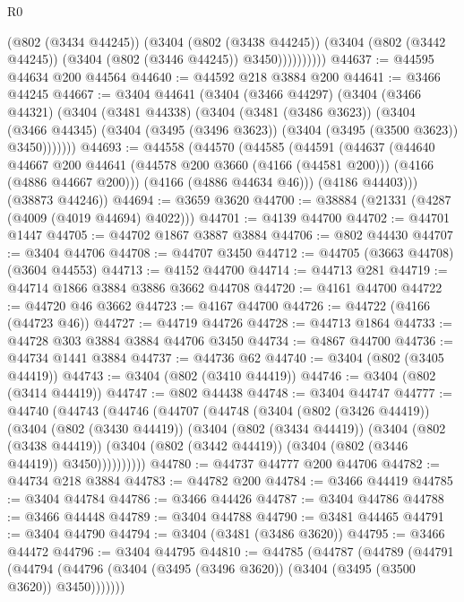 \begin{lexlean}{R0}
\begin{coremodule}
                  (@802 (@3434 @44245))
                  (@3404
                    (@802 (@3438 @44245))
                    (@3404 (@802 (@3442 @44245)) (@3404 (@802 (@3446 @44245)) @3450))))))))))
@44637 := @44595 @44634 @200 @44564
@44640 := @44592 @218 @3884 @200
@44641 := @3466 @44245
@44667 := @3404
    @44641
    (@3404
      (@3466 @44297)
      (@3404
        (@3466 @44321)
        (@3404
          (@3481 @44338)
          (@3404
            (@3481 (@3486 @3623))
            (@3404
              (@3466 @44345)
              (@3404 (@3495 (@3496 @3623)) (@3404 (@3495 (@3500 @3623)) @3450)))))))
@44693 := @44558
    (@44570
      (@44585
        (@44591
          (@44637
            (@44640
              @44667
              @200
              @44641
              (@44578 @200 @3660 (@4166 (@44581 @200)))
              (@4166 (@4886 @44667 @200)))
            (@4166 (@4886 @44634 @46)))
          (@4186 @44403)))
      (@38873 @44246))
@44694 := @3659 @3620
@44700 := @38884 (@21331 (@4287 (@4009 (@4019 @44694) @4022)))
@44701 := @4139 @44700
@44702 := @44701 @1447
@44705 := @44702 @1867 @3887 @3884
@44706 := @802 @44430
@44707 := @3404 @44706
@44708 := @44707 @3450
@44712 := @44705 (@3663 @44708) (@3604 @44553)
@44713 := @4152 @44700
@44714 := @44713 @281
@44719 := @44714 @1866 @3884 @3886 @3662 @44708
@44720 := @4161 @44700
@44722 := @44720 @46 @3662
@44723 := @4167 @44700
@44726 := @44722 (@4166 (@44723 @46))
@44727 := @44719 @44726
@44728 := @44713 @1864
@44733 := @44728 @303 @3884 @3884 @44706 @3450
@44734 := @4867 @44700
@44736 := @44734 @1441 @3884
@44737 := @44736 @62
@44740 := @3404 (@802 (@3405 @44419))
@44743 := @3404 (@802 (@3410 @44419))
@44746 := @3404 (@802 (@3414 @44419))
@44747 := @802 @44438
@44748 := @3404 @44747
@44777 := @44740
    (@44743
      (@44746
        (@44707
          (@44748
            (@3404
              (@802 (@3426 @44419))
              (@3404
                (@802 (@3430 @44419))
                (@3404
                  (@802 (@3434 @44419))
                  (@3404
                    (@802 (@3438 @44419))
                    (@3404 (@802 (@3442 @44419)) (@3404 (@802 (@3446 @44419)) @3450))))))))))
@44780 := @44737 @44777 @200 @44706
@44782 := @44734 @218 @3884
@44783 := @44782 @200
@44784 := @3466 @44419
@44785 := @3404 @44784
@44786 := @3466 @44426
@44787 := @3404 @44786
@44788 := @3466 @44448
@44789 := @3404 @44788
@44790 := @3481 @44465
@44791 := @3404 @44790
@44794 := @3404 (@3481 (@3486 @3620))
@44795 := @3466 @44472
@44796 := @3404 @44795
@44810 := @44785
    (@44787
      (@44789
        (@44791
          (@44794 (@44796 (@3404 (@3495 (@3496 @3620)) (@3404 (@3495 (@3500 @3620)) @3450)))))))

\end{coremodule}
\end{lexlean}
